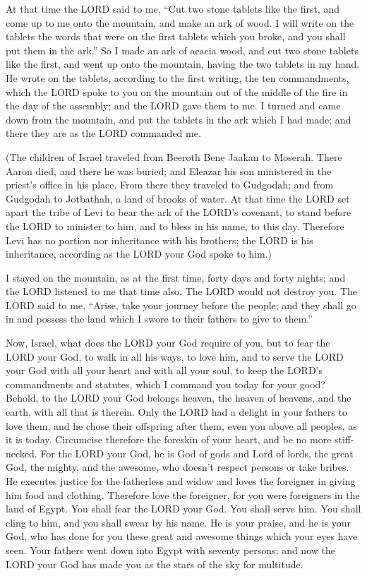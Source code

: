 \mychapter{} \myverse*{}At that time the LORD said to me, “Cut two stone tablets like
the first, and come up to me onto the mountain, and make an ark of wood.
\myverse{}I will write on the tablets the words that were on the first tablets which
you broke, and you shall put them in the ark.”
\myverse{}So I made an ark of acacia wood, and cut two stone tablets like the first,
and went up onto the mountain, having the two tablets in my hand.
\myverse{}He wrote on the tablets, according to the first writing, the ten commandments,
which the LORD spoke to you on the mountain out of the middle of the fire in the day of the assembly;
and the LORD gave them to me.
\myverse{}I turned and came down from the mountain, and put the tablets in the ark which
I had made; and there they are as the LORD commanded me.


\myverse{}(The children of Israel traveled from Beeroth Bene Jaakan to Moserah.
There Aaron died, and there he was buried; and Eleazar his son ministered in the priest’s office in his
place.
\myverse{}From there they traveled to Gudgodah; and from Gudgodah to Jotbathah, a land
of brooks of water.
\myverse{}At that time the LORD set apart the tribe of Levi to bear the ark of the LORD’s
covenant, to stand before the LORD to minister to him, and to bless in his name, to this day.
\myverse{}Therefore Levi has no portion nor inheritance with his brothers; the LORD is
his inheritance, according as the LORD your God spoke to him.)


\myverse{}I stayed on the mountain, as at the first time, forty days and
forty nights; and the LORD listened to me that time also. The LORD would not destroy you.
\myverse{}The LORD said to me, “Arise, take your journey before the people; and they
shall go in and possess the land which I swore to their fathers to give to them.”


\myverse{}Now, Israel, what does the LORD your God require of you, but
to fear the LORD your God, to walk in all his ways, to love him, and to serve the LORD your God with all
your heart and with all your soul,
\myverse{}to keep the LORD’s commandments and statutes, which I command you today for
your good?
\myverse{}Behold, to the LORD your God belongs heaven, the heaven of heavens, and the
earth, with all that is therein.
\myverse{}Only the LORD had a delight in your fathers to love them, and he chose their
offspring after them, even you above all peoples, as it is today.
\myverse{}Circumcise therefore the foreskin of your heart, and be no more stiff-necked.
\myverse{}For the LORD your God, he is God of gods and Lord of lords, the great God,
the mighty, and the awesome, who doesn’t respect persons or take bribes.
\myverse{}He executes justice for the fatherless and widow and loves the foreigner
in giving him food and clothing.
\myverse{}Therefore love the foreigner, for you were foreigners in the land of Egypt.
\myverse{}You shall fear the LORD your God. You shall serve him. You shall cling to
him, and you shall swear by his name.
\myverse{}He is your praise, and he is your God, who has done for you these great and
awesome things which your eyes have seen.
\myverse{}Your fathers went down into Egypt with seventy persons; and now the LORD
your God has made you as the stars of the sky for multitude.


